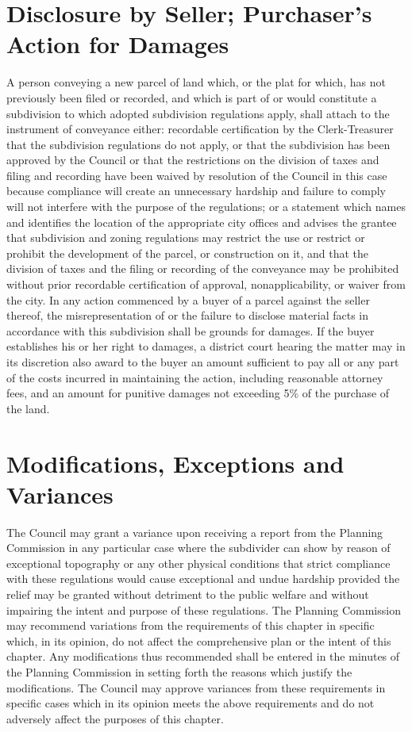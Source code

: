 \section{Disclosure by Seller; Purchaser’s Action for Damages}
A person conveying a new parcel of land which, or the plat for which, has not previously been filed or recorded, and which is part of or would constitute a subdivision to which adopted subdivision regulations apply, shall attach to the instrument of conveyance either: recordable certification by the Clerk-Treasurer that the subdivision regulations do not apply, or that the subdivision has been approved by the Council or that the restrictions on the division of taxes and filing and recording have been waived by resolution of the Council in this case because compliance will create an unnecessary hardship and failure to comply will not interfere with the purpose of the regulations; or a statement which names and identifies the location of the appropriate city offices and advises the grantee that subdivision and zoning regulations may restrict the use or restrict or prohibit the development of the parcel, or construction on it, and that the division of taxes and the filing or recording of the conveyance may be prohibited without prior recordable certification of approval, nonapplicability, or waiver from the city. In any action commenced by a buyer of a parcel against the seller thereof, the misrepresentation of or the failure to disclose material facts in accordance with this subdivision shall be grounds for damages.  If the buyer establishes his or her right to damages, a district court hearing the matter may in its discretion also award to the buyer an amount sufficient to pay all or any part of the costs incurred in maintaining the action, including reasonable attorney fees, and an amount for punitive damages not exceeding 5\% of the purchase of the land.

\section{Modifications, Exceptions and Variances}
The Council may grant a variance upon receiving a report from the Planning Commission in any particular case where the subdivider can show by reason of exceptional topography or any other physical conditions that strict compliance with these regulations would cause exceptional and undue hardship provided the relief may be granted without detriment to the public welfare and without impairing the intent and purpose of these regulations. The Planning Commission may recommend variations from the requirements of this chapter in specific which, in its opinion, do not affect the comprehensive plan or the intent of this chapter.  Any modifications thus recommended shall be entered in the minutes of the Planning Commission in setting forth the reasons which justify the modifications.  The Council may approve variances from these requirements in specific cases which in its opinion meets the above requirements and do not adversely affect the purposes of this chapter.

